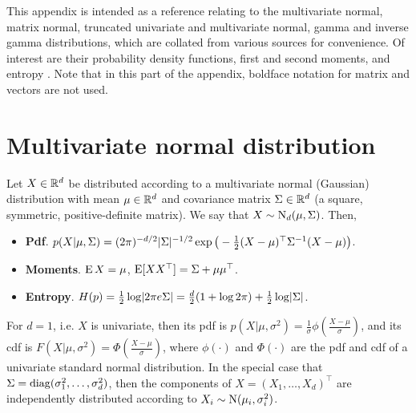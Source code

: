 This appendix is intended as a reference relating to the multivariate normal,  matrix normal, truncated univariate and multivariate normal, gamma and inverse gamma distributions, which are collated from various sources for convenience.
Of interest are their probability density functions, first and second moments, and entropy .
Note that in this part of the appendix, boldface notation for matrix and vectors are not used.

\section{Multivariate normal distribution}

\begin{definition}
  Let $X\in\bbR^d$ be distributed according to a multivariate normal (Gaussian) distribution with mean $\mu \in \bbR^d$ and covariance matrix $\Sigma \in\bbR^d$ (a square, symmetric, positive-definite matrix).
  We say that $X\sim\N_d(\mu,\Sigma)$.
  Then,
  \begin{itemize}
    \item \textbf{Pdf}. $p(X|\mu,\Sigma) = (2\pi)^{-d/2}|\Sigma|^{-1/2}\exp\big(-\half (X-\mu)^\top\Sigma^{-1}(X-\mu)\big)$.
    \item \textbf{Moments}. $\E X=\mu$, $\E [XX^\top] = \Sigma + \mu \mu^\top$.
    \item \textbf{Entropy}. $H(p) = \half \log \abs{2\pi e \Sigma} = \half[d](1 + \log 2\pi) + \half\log\abs{\Sigma}$.
  \end{itemize}
\end{definition}

For $d=1$, i.e. $X$ is univariate, then its pdf is $p(X|\mu,\sigma^2) = \frac{1}{\sigma}\phi \left( \frac{X-\mu}{\sigma} \right)$, and its cdf is $F(X|\mu,\sigma^2) = \Phi \left( \frac{X-\mu}{\sigma} \right)$, where $\phi(\cdot)$ and $\Phi(\cdot)$ are the pdf and cdf of a univariate standard normal distribution.
In the special case that $\Sigma = \diag(\sigma_1^2,\dots,\sigma_d^2)$, then the components of $X=(X_1,\dots,X_d)^\top$ are independently distributed according to $X_i\sim\N(\mu_i,\sigma_i^2)$.

